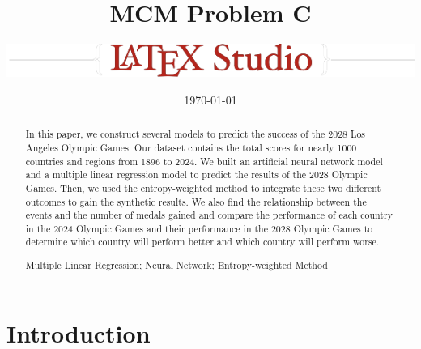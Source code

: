 \documentclass{mcmthesis}
\title{MCM Problem C}
\author{\small \href{https://www.latexstudio.net/}
  {\includegraphics{mcmthesis-logo}}}
\date{\today}
\begin{document}
\begin{abstract}
\par %




\begin{Abstract}
In this paper, we construct several models to predict the success of the 2028 Los Angeles Olympic Games. Our dataset contains the total scores for nearly 1000 countries and regions from 1896 to 2024. We built an artificial neural network model and a multiple linear regression model to predict the results of the 2028 Olympic Games. Then, we used the entropy-weighted method to integrate these two different outcomes to gain the synthetic results. We also find the relationship between the events and the number of medals gained and compare the performance of each country in the 2024 Olympic Games and their performance in the 2028 Olympic Games to determine which country will perform better and which country will perform worse.
\end{Abstract}
\begin{keywords}
Multiple Linear Regression; Neural Network; Entropy-weighted Method
\end{keywords}
\end{abstract}
\maketitle
\tableofcontents
\newpage
\section{Introduction}
\end{document}
